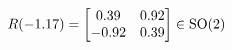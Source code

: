\documentclass[preview]{standalone}
\begin{document}
\begin{align*}
\special{dvisvgm:raw <g id='unique000'>}R(-1.17) = \begin{bmatrix} 0.39 & 0.92 \\ -0.92 & 0.39 \end{bmatrix} \in \text{SO}(2)\special{dvisvgm:raw </g>}
\end{align*}
\end{document}

